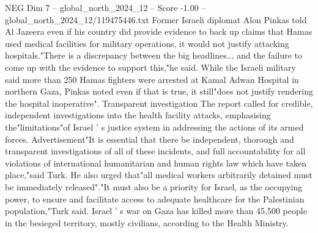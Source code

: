 \begin{textsample}{NEG Dim 7 – global\_north\_2024\_12 – Score -1.00 – global\_north\_2024\_12/119475446.txt}
Former Israeli diplomat Alon Pinkas told Al Jazeera even if his country did provide evidence to back up claims that Hamas used medical facilities for military operations, it would not justify attacking hospitals."There is a discrepancy between the big headlines... and the failure to come up with the evidence to support this,"he said.
While the Israeli military said more than 250 Hamas fighters were arrested at Kamal Adwan Hospital in northern Gaza, Pinkas noted even if that is true, it still"does not justify rendering the hospital inoperative".
Transparent investigation The report called for credible, independent investigations into the health facility attacks, emphasising the"limitations"of Israel ' s justice system in addressing the actions of its armed forces.
Advertisement"It is essential that there be independent, thorough and transparent investigations of all of these incidents, and full accountability for all violations of international humanitarian and human rights law which have taken place,"said Turk.
He also urged that"all medical workers arbitrarily detained must be immediately released"."It must also be a priority for Israel, as the occupying power, to ensure and facilitate access to adequate healthcare for the Palestinian population,"Turk said.
Israel ' s war on Gaza has killed more than 45,500 people in the besieged territory, mostly civilians, according to the Health Ministry.

\end{textsample}

